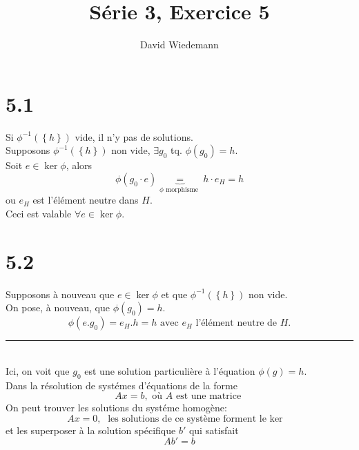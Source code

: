 \documentclass[11pt, a4paper, twoside]{article}
\newcommand\hr{
    \noindent\rule[0.5ex]{\linewidth}{0.5pt}
}
\begin{document}
\title{Série 3, Exercice 5}
\author{David Wiedemann}
\maketitle
\section*{5.1}
Si $\phi^{-1}\left( \left\{ h \right\} \right)$ vide, il n'y pas de solutions.\\
Supposons $\phi^{-1}( \left\{ h \right\} )$ non vide, $\exists g_0$ tq. $\phi(g_0) = h$.\\
Soit $e \in \ker \phi$, alors
\[ 
	\phi ( g_0 \cdot e   ) \underbrace{=}_{\phi \text{ morphisme } } h \cdot e_H = h
\]
ou $e_H$ est l'élément neutre dans $H$.\\
Ceci est valable $\forall e \in \ker \phi$.
\section*{5.2}
Supposons à nouveau que $e \in \ker \phi$ et que $\phi^{-1}( \left\{ h \right\} )$ non vide.\\
On pose, à nouveau, que $ \phi( g_0 ) =h $.
\[ 
	\phi(e. g_0) = e_H . h = h \text{ avec  $e_H$ l'élément neutre de $H$.} 
\]
\hr\\
Ici, on voit que  $ g_0$ est une solution particulière à l'équation $\phi(g) =h$.\\
Dans la résolution de systémes d'équations de la forme
\[ 
Ax =b, \text{ où $A$ est une matrice } 
\]
On peut trouver les solutions du systéme homogène:
\[ 
Ax=0, \text{ les solutions de ce système forment le $\ker$ } 
\]
et les superposer à la solution spécifique $b'$ qui satisfait
\[ 
A b' = b
\]
\end{document}
